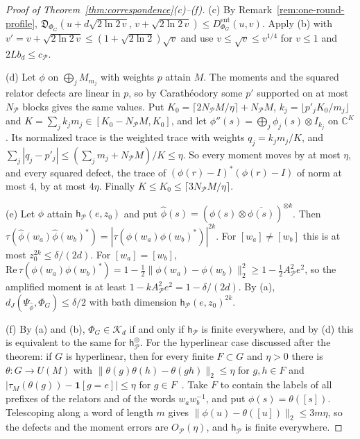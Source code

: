 \documentclass[11pt,a4paper]{article}
\theoremstyle{plain}
\theoremstyle{definition}
\theoremstyle{remark}
\newcommand{\dJ}{d_J}
\newcommand{\Dsupp}{\mathfrak{D}}
\begin{document}
\begin{proof}[Proof of Theorem~\ref{thm:correspondence}(c)--(f)]
(c) By Remark~\ref{rem:one-round-profile}, $\Dsupp_{\Phi_G}(u+d\sqrt{2\ln2\,v},\,v+\sqrt{2\ln2\,v})\le D^{\mathrm{ent}}_{\Phi_G}(u,v)$. Apply (b) with $v'=v+\sqrt{2\ln2\,v}\le(1+\sqrt{2\ln2})\sqrt v$
and use $v\le\sqrt v\le v^{1/4}$ for $v\le1$ and $2Lb_d\le c_{\mathcal P}$.

(d) Let $\phi$ on $\bigoplus_jM_{m_j}$ with weights $p$ attain $M$. The moments and the squared relator defects are linear in $p$, so by Carath\'eodory
some $p'$ supported on at most $N_{\mathcal P}$ blocks gives the same values. Put $K_0=\lceil2N_{\mathcal P}M/\eta\rceil+N_{\mathcal P}M$, $k_j=\lfloor p'_jK_0/m_j\rfloor$ and
$K=\sum_jk_jm_j\in[K_0-N_{\mathcal P}M,K_0]$, and let $\phi''(s)=\bigoplus_j\phi_j(s)\otimes I_{k_j}$ on $\mathbb C^K$. Its normalized trace is the weighted trace with
weights $q_j=k_jm_j/K$, and $\sum_j|q_j-p'_j|\le(\sum_jm_j+N_{\mathcal P}M)/K\le\eta$. So every moment moves by at most $\eta$, and every squared defect,
the trace of $(\phi(r)-I)^*(\phi(r)-I)$ of norm at most $4$, by at most $4\eta$. Finally $K\le K_0\le\lceil3N_{\mathcal P}M/\eta\rceil$.

(e) Let $\phi$ attain $\mathsf h_{\mathcal P}(e,z_0)$ and put $\widehat\phi(s)=(\phi(s)\otimes\overline{\phi(s)})^{\otimes k}$. Then
$\tau(\widehat\phi(w_a)\widehat\phi(w_b)^*)=|\tau(\phi(w_a)\phi(w_b)^*)|^{2k}$. For $[w_a]\ne[w_b]$ this is at most $z_0^{2k}\le\delta/(2d)$. For $[w_a]=[w_b]$,
$\mathrm{Re}\,\tau(\phi(w_a)\phi(w_b)^*)=1-\frac12\|\phi(w_a)-\phi(w_b)\|_2^2\ge1-\frac12A_{\mathcal P}^2e^2$, so the amplified moment is at least
$1-kA_{\mathcal P}^2e^2=1-\delta/(2d)$. By (a), $\dJ(\Psi_{\widehat\phi},\Phi_G)\le\delta/2$ with bath dimension $\mathsf h_{\mathcal P}(e,z_0)^{2k}$.

(f) By (a) and (b), $\Phi_G\in\mathcal K_d$ if and only if $\mathsf h_{\mathcal P}$ is finite everywhere, and by (d) this is equivalent to the same for $\mathsf h^\oplus_{\mathcal P}$. For the hyperlinear case discussed after the theorem: if $G$ is
hyperlinear, then for every finite $F\subset G$ and $\eta>0$ there is $\theta:G\to U(M)$ with $\|\theta(g)\theta(h)-\theta(gh)\|_2\le\eta$ for $g,h\in F$ and
$|\tau_M(\theta(g))-\mathbf 1[g=e]|\le\eta$ for $g\in F$~\cite{Pestov2008}. Take $F$ to contain the labels of all prefixes of the relators and of the words
$w_aw_b^{-1}$, and put $\phi(s)=\theta([s])$. Telescoping along a word of length $m$ gives $\|\phi(u)-\theta([u])\|_2\le3m\eta$, so the defects and the moment
errors are $O_{\mathcal P}(\eta)$, and $\mathsf h_{\mathcal P}$ is finite everywhere.
\end{proof}
\end{document}
